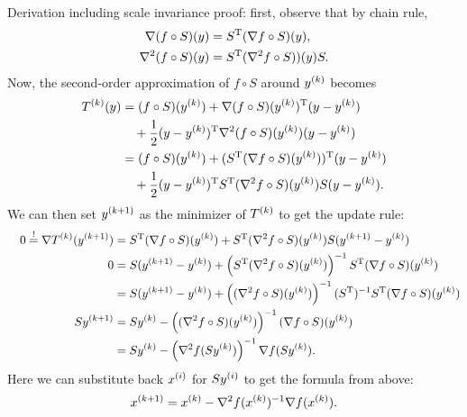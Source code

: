 \documentclass{article}
\begin{document}
Derivation including scale invariance proof: first, observe that by chain rule,
\begin{align*}
  \nabla (f \circ S)(y) &= \T{S}(\nabla f \circ S)(y), \\
  \nabla^2 (f \circ S)(y) &= \T{S}(\nabla^2 f \circ S))(y)S.
\end{align*}
Now, the second-order approximation of \(f \circ S\) around \(\kth{y}\) becomes
\begin{align*}
  \kth{T}(y) &= (f \circ S)(\kth{y}) + \T{\nabla (f \circ S)(\kth{y})}(y - \kth{y}) \\
             &\quad + \frac{1}{2} \T{(y - \kth{y})} \nabla^2 (f \circ S)(\kth{y}) (y - \kth{y}) \\
             &= (f \circ S)(\kth{y}) + \T{(\T{S}(\nabla f \circ S)(\kth{y}))}(y - \kth{y}) \\
             &\quad + \frac{1}{2} \T{(y - \kth{y})}
               \T{S}(\nabla^2 f \circ S)(\kth{y})S (y - \kth{y}).
\end{align*}
We can then set \(\kth[k+1]{y}\) as the minimizer of \(\kth{T}\) to get the update rule:
\begin{align*}
  & & 0 \overset{!}{=} \nabla \kth{T}(\kth[k+1]{y}) &= \T{S}(\nabla f \circ S)(\kth{y})
                                                      + \T{S}(\nabla^2 f \circ S)(\kth{y})S
                                                      (\kth[k+1]{y} - \kth{y}) \\
  & & 0 &= S(\kth[k+1]{y} - \kth{y}) + \left( \T{S}(\nabla^2 f \circ S)(\kth{y}) \right)^{-1}
          \T{S}(\nabla f \circ S)(\kth{y}) \\
  & & &= S(\kth[k+1]{y} - \kth{y}) + \left( (\nabla^2 f \circ S)(\kth{y}) \right)^{-1} (\T{S})^{-1}
          \T{S}(\nabla f \circ S)(\kth{y}) \\
  & & S\kth[k+1]{y} &= S\kth{y} - \left( (\nabla^2 f \circ S)(\kth{y}) \right)^{-1}
                      (\nabla f \circ S)(\kth{y}) \\
  & & &= S\kth{y} - \left( \nabla^2 f(S\kth{y}) \right)^{-1}
                      \nabla f(S\kth{y}).
\end{align*}
Here we can substitute back \(\kth[i]{x}\) for \(S\kth[i]{y}\) to get the formula from above:
\begin{equation*}
  \kth[k+1]{x} = \kth{x} - \nabla^2 f(\kth{x})^{-1} \nabla f(\kth{x}).
\end{equation*}
\end{document}
